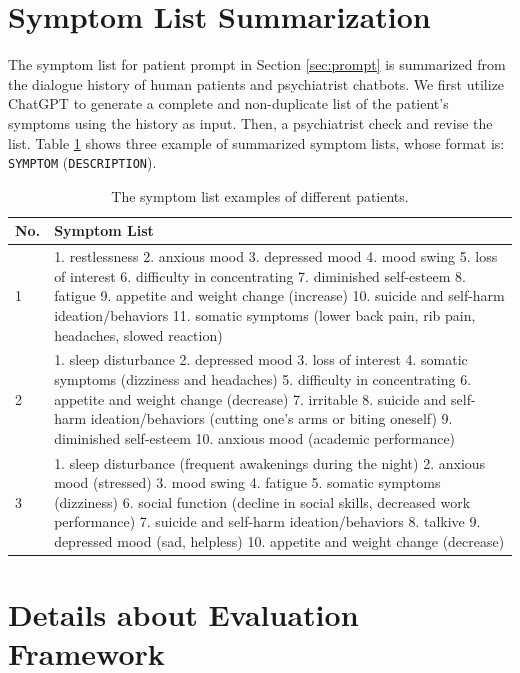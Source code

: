 \section{Symptom List Summarization}
\label{apd:symp_list}

The symptom list for patient prompt in Section \ref{sec:prompt} is summarized from the dialogue history of human patients and psychiatrist chatbots. We first utilize ChatGPT to generate a complete and non-duplicate list of the patient's symptoms using the history as input. Then, a psychiatrist check and revise the list. Table \ref{tab:symp_list} shows three example of summarized symptom lists, whose format is: \texttt{SYMPTOM} (\texttt{DESCRIPTION}).

\begin{table}[th]
    \footnotesize
    \centering
    \begin{tabular}{ m{} | m{} }
    \hline
    No. & Symptom List \\
    \hline
    1 & 1. restlessness 2. anxious mood 3. depressed mood 4. mood swing 5. loss of interest 6. difficulty in concentrating 7. diminished self-esteem  8. fatigue 9. appetite and weight change (increase) 10. suicide and self-harm ideation/behaviors 11. somatic symptoms (lower back pain, rib pain, headaches, slowed reaction) \\
    \hline
    2 & 1. sleep disturbance 2. depressed mood 3. loss of interest 4.  somatic symptoms (dizziness and headaches) 5. difficulty in concentrating 6. appetite and weight change (decrease) 7. irritable 8. suicide and self-harm ideation/behaviors (cutting one's arms or biting oneself) 9. diminished self-esteem 10. anxious mood (academic performance) \\
    \hline
    3 & 1. sleep disturbance (frequent awakenings during the night) 2. anxious mood (stressed) 3. mood swing 4. fatigue 5. somatic symptoms (dizziness) 6. social function (decline in social skills, decreased work performance) 7. suicide and self-harm ideation/behaviors 8. talkive 9. depressed mood (sad, helpless) 10. appetite and weight change (decrease) \\   
    \hline
    \end{tabular}
    \caption{The symptom list examples of different patients.}
    \label{tab:symp_list}
\end{table}

\section{Details about Evaluation Framework}

